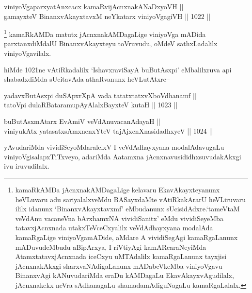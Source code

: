 
\begin{shl}
viniyoVgaparxyatAnxcacx kamaRvijAcnxnakANaDxyoVH || \\
gamayxteV BinanxvAkayxtavxM neYkatarx viniyoVgagiVH \hfill || 1022 ||  
\end{shl}

\begin{artha}
\footnote{kamaRkAMDa jAcnxnakAMDagaLige kelavaru EkavAkayxteyanunx heVLuvaru adu sariyalalxveMdu BASayxdaMte vAtiRkakArarU heVLiruvaru ililx idanunx `BinanxvAkayxtavxmf' eMbudanunx sUcisidAdxre.`tameVtaM veVdAnu vacaneVna bArxhamxNA vividiSanitx' eMdu vividiSeyeMba tatavxjAcnxnada utakxTeVceCxyalilx veVdAdhayxyana modalAda kamaRgaLige viniyoVgamADide, aMdare A vividiSegAgi kamaRgaLanunx mADuvudeMbudu aBipArxya, I riVtiyAgi kamARcaraNeyiMda AtamxtatavxjAcnxnada iceCxyu uMTAdalilx kamaRgaLanunx tayxjisi jAcnxnakAkxgi sharxvaNAdigaLanunx mADabeVkeMba viniyoVgavu BinanxvAgi kANuvudariMda eraDu kAMDagaLu EkavAkayxvAgudilalx, jAcnxnakekx neVra sAdhanagaLu shamadamAdiguNagaLu kamaRgaLalalx.} kamaRkAMDa matutx jAcnxnakAMDagaLige viniyoVga mADida parxtanxdiMdalU BinanxvAkayxteyu toVruvudu, oMdeV sathxLadalilx viniyoVgavilalx.
\end{artha}

\begin{artha}
hiMde 1021ne vAtiRkadalilx `IshavxraviSayA buButAsxpi' eMbalilxruva api shabadxdiMda sUcitavAda athaRvanunx heVLutAtxre{\rm --}
\end{artha}

\begin{shl}
yadavxButAsx\s pi duSApxrXpA vada tatatxtatxvXboVdhanamf || \\
tatoV\s pi dulaRBataramupAyAlalxBayxteV kutaH \hfill || 1023 ||  
\end{shl}


\begin{shl}
buButAsxmAtarx EvAmiV veVdAnuvacanAdayaH || \\
viniyukAtx yatasatxsAmxnenxYteV tajAjxcnXnasidadhxyeV \hfill || 1024 ||  
\end{shl}

\begin{artha}
yAvudariMda vividiSeyoMdaralelxV I veVdAdhayxyana modalAdavugaLu viniyoVgisalapxTiTxveyo, adariMda Aatamxna jAcnxnavusididhxsuvudakAkxgi ivu iruvudilalx.
\end{artha}

